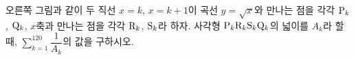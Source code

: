 \noindent\begin{minipage}[t]{0.58\linewidth}\vspace{0pt}\raggedright 오른쪽 그림과 같이 두 직선 $x=k$, $x=k+1$이 곡선 $y=\sqrt{x}$와 만나는 점을 각각 $\mathrm{P}_k$, $\mathrm{Q}_k$, $x$축과 만나는 점을 각각 $\mathrm{R}_k$, $\mathrm{S}_k$라 하자. 사각형 $\mathrm{P}_k\mathrm{R}_k\mathrm{S}_k\mathrm{Q}_k$의 넓이를 $A_k$라 할 때, $\displaystyle\sum_{k=1}^{120}\dfrac{1}{A_k}$의 값을 구하시오.\end{minipage}\hfill\begin{minipage}[t]{0.4\linewidth}\vspace{0pt}\centering \resizebox{\ifdim\width>\linewidth\linewidth\else\width\fi}{!}{}\end{minipage}\par
